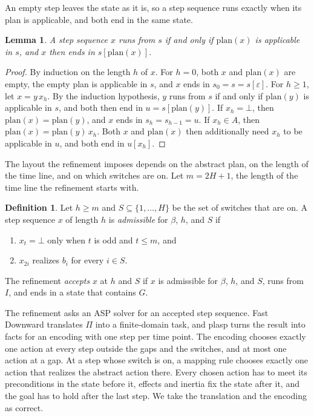 \documentclass{article}
\theoremstyle{definition}
\newtheorem{definition}{Definition}
\theoremstyle{plain}
\newtheorem{lemma}{Lemma}
\theoremstyle{definition}
\begin{document}
An empty step leaves the state as it is, so a step sequence runs exactly when its plan is applicable, and both end in the same state.

\begin{lemma}\label{lem:steps}
A step sequence $x$ runs from $s$ if and only if $\mathrm{plan}(x)$ is applicable in $s$, and $x$ then ends in $s[\mathrm{plan}(x)]$.
\end{lemma}

\begin{proof}
By induction on the length $h$ of $x$. For $h = 0$, both $x$ and $\mathrm{plan}(x)$ are empty, the empty plan is applicable in $s$, and $x$ ends in $s_0 = s = s[\varepsilon]$. For $h \geq 1$, let $x = y\,x_h$. By the induction hypothesis, $y$ runs from $s$ if and only if $\mathrm{plan}(y)$ is applicable in $s$, and both then end in $u = s[\mathrm{plan}(y)]$. If $x_h = \bot$, then $\mathrm{plan}(x) = \mathrm{plan}(y)$, and $x$ ends in $s_h = s_{h-1} = u$. If $x_h \in A$, then $\mathrm{plan}(x) = \mathrm{plan}(y)\,x_h$. Both $x$ and $\mathrm{plan}(x)$ then additionally need $x_h$ to be applicable in $u$, and both end in $u[x_h]$.
\end{proof}

The layout the refinement imposes depends on the abstract plan, on the length of the time line, and on which switches are on. Let $m = 2H+1$, the length of the time line the refinement starts with.

\begin{definition}\label{def:admissible}
Let $h \geq m$ and $S \subseteq \{1,\dots,H\}$ be the set of switches that are on. A step sequence $x$ of length $h$ is \emph{admissible} for $\beta$, $h$, and $S$ if
\begin{enumerate}
  \item $x_t = \bot$ only when $t$ is odd and $t \leq m$, and
  \item $x_{2i}$ realizes $b_i$ for every $i \in S$.
\end{enumerate}
The refinement \emph{accepts} $x$ at $h$ and $S$ if $x$ is admissible for $\beta$, $h$, and $S$, runs from $I$, and ends in a state that contains $G$.
\end{definition}

The refinement asks an ASP solver for an accepted step sequence. Fast Downward translates $\Pi$ into a finite-domain task, and plasp turns the result into facts for an encoding with one step per time point. The encoding chooses exactly one action at every step outside the gaps and the switches, and at most one action at a gap. At a step whose switch is on, a mapping rule chooses exactly one action that realizes the abstract action there. Every chosen action has to meet its preconditions in the state before it, effects and inertia fix the state after it, and the goal has to hold after the last step. We take the translation and the encoding as correct.
\end{document}

